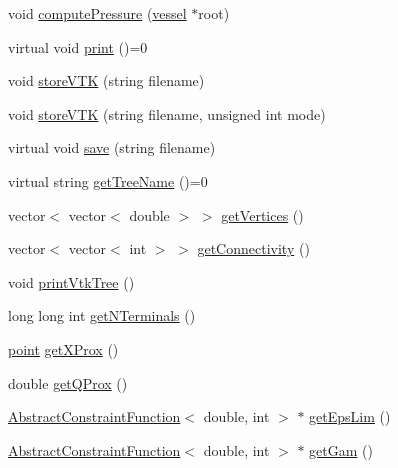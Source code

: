 \begin{DoxyCompactItemize}
\item 
void \hyperlink{class_abstract_structured_c_c_o_tree_ad9a13faaabbb462ded459e5a9591b1b4}{compute\+Pressure} (\hyperlink{structvessel}{vessel} $\ast$root)
\item 
virtual void \hyperlink{class_abstract_structured_c_c_o_tree_ab28e036b4d82004ab4bafa964d7f7c97}{print} ()=0
\item 
void \hyperlink{class_abstract_structured_c_c_o_tree_a4886ea6cee8ac3771a30727825ab1092}{store\+V\+TK} (string filename)
\item 
void \hyperlink{class_abstract_structured_c_c_o_tree_a0f1333161fd43de84314b827ac82f5f5}{store\+V\+TK} (string filename, unsigned int mode)
\item 
virtual void \hyperlink{class_abstract_structured_c_c_o_tree_ae948aa5785cca23860f98acd91315480}{save} (string filename)
\item 
virtual string \hyperlink{class_abstract_structured_c_c_o_tree_a32e56a263498bc04c3c552fc7de30554}{get\+Tree\+Name} ()=0
\item 
vector$<$ vector$<$ double $>$ $>$ \hyperlink{class_abstract_structured_c_c_o_tree_a9de1840215390c5a396809b430347cbd}{get\+Vertices} ()
\item 
vector$<$ vector$<$ int $>$ $>$ \hyperlink{class_abstract_structured_c_c_o_tree_a9b3f4467c0955b99278495050932b6e0}{get\+Connectivity} ()
\item 
void \hyperlink{class_abstract_structured_c_c_o_tree_a6be7092ab1cce8991b1b43fb527675cb}{print\+Vtk\+Tree} ()
\item 
long long int \hyperlink{class_abstract_structured_c_c_o_tree_a0ddb28f7cb449f1c529f8b1f80af2756}{get\+N\+Terminals} ()
\item 
\hyperlink{structpoint}{point} \hyperlink{class_abstract_structured_c_c_o_tree_a51900d064692213a11fab39ea1d880ef}{get\+X\+Prox} ()
\item 
double \hyperlink{class_abstract_structured_c_c_o_tree_a5235386424ce702fceca86bf2521dd7c}{get\+Q\+Prox} ()
\item 
\hyperlink{class_abstract_constraint_function}{Abstract\+Constraint\+Function}$<$ double, int $>$ $\ast$ \hyperlink{class_abstract_structured_c_c_o_tree_ad5e5bce5de7fb13c313d8031c214cf8f}{get\+Eps\+Lim} ()
\item 
\hyperlink{class_abstract_constraint_function}{Abstract\+Constraint\+Function}$<$ double, int $>$ $\ast$ \hyperlink{class_abstract_structured_c_c_o_tree_a57459e2a67c1254ecdf9f065e83e8c14}{get\+Gam} ()
\item 

\end{DoxyCompactItemize}
